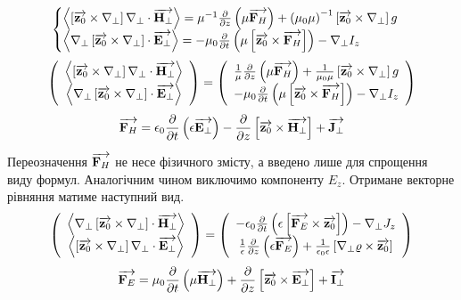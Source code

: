%
\textcolor{lightgray}{ \begin{equation*} \begin{aligned}
\begin{cases} 
\left< \left[ \overrightarrow{\mathbf z_0} \times \nabla_\perp \right] \nabla_\perp \cdot \overrightarrow{\mathbf H_\perp} \right> = 
\mu^{-1} \frac{\partial }{\partial z} \left( \mu \overrightarrow{\mathbf F_H} \right) +
\left( \mu_0 \mu \right)^{-1} \left[ \overrightarrow{\mathbf z_0} \times \nabla_\perp \right] g \\
\left< \nabla_\perp \left[ \overrightarrow{\mathbf z_0} \times \nabla_\perp \right] \cdot \overrightarrow{\mathbf E_\perp} \right>
= - \mu_0 \frac{\partial }{\partial t} \left( \mu \left[ \overrightarrow{\mathbf z_0} \times \overrightarrow{\mathbf F_H} \right] \right) -
\nabla_\perp I_z 
\end{cases}
\end{aligned} \end{equation*} }
%
\begin{equation}
\left( \begin{array}{c} 
\left< \left[ \overrightarrow{\mathbf z_0} \times \nabla_\perp \right] \nabla_\perp \cdot \overrightarrow{\mathbf H_\perp} \right> \\
\left< \nabla_\perp \left[ \overrightarrow{\mathbf z_0} \times \nabla_\perp \right] \cdot \overrightarrow{\mathbf E_\perp} \right> \\
\end{array} \right) = \left( \begin{array}{c} 
\frac{1}{\mu} \frac{\partial }{\partial z} \left( \mu \overrightarrow{\mathbf F_H} \right) +
\frac{1}{\mu_0 \mu} \left[ \overrightarrow{\mathbf z_0} \times \nabla_\perp \right] g \\
- \mu_0 \frac{\partial }{\partial t} \left( \mu \left[ \overrightarrow{\mathbf z_0} \times \overrightarrow{\mathbf F_H} \right] \right) -
\nabla_\perp I_z 
\end{array} \right)
\end{equation}
%
\begin{equation*}
\overrightarrow{\mathbf F_H} = \epsilon_0 \frac{\partial }{\partial t} \left( \epsilon \overrightarrow{\mathbf E_\perp} \right) - 
\frac{\partial }{\partial z} \left[ \overrightarrow{\mathbf z_0} \times \overrightarrow{\mathbf H_\perp} \right] + \overrightarrow{\mathbf J_\perp}
\end{equation*}

Переозначення $ \overrightarrow{\mathbf F_H} $ не несе фізичного змісту, а введено лише для 
спрощення виду формул. Аналогічним чином виключимо компоненту $ E_z $. Отримане 
векторне рівняння матиме наступний вид.
%
\begin{equation}
\left( \begin{array}{c} 
\left< \nabla_\perp \left[ \overrightarrow{\mathbf z_0} \times \nabla_\perp \right] \cdot \overrightarrow{\mathbf H_\perp} \right> \\
\left< \left[ \overrightarrow{\mathbf z_0} \times \nabla_\perp \right] \nabla_\perp \cdot \overrightarrow{\mathbf E_\perp} \right> \\
\end{array} \right) = \left( \begin{array}{c} 
- \epsilon_0 \frac{\partial }{\partial t} \left( \epsilon \left[ \overrightarrow{\mathbf F_E} \times \overrightarrow{\mathbf z_0} \right] 
\right) - \nabla_\perp J_z \\
\frac{1}{\epsilon} \frac{\partial }{\partial z} \left( \epsilon \overrightarrow{\mathbf F_E} \right) +
\frac{1}{\epsilon_0 \epsilon} \left[ \nabla_\perp \varrho \times \overrightarrow{\mathbf z_0} \right]
\end{array} \right)
\end{equation}
%
\begin{equation*}
\overrightarrow{\mathbf F_E} = \mu_0 \frac{\partial }{\partial t} \left( \mu  \overrightarrow{\mathbf H_\perp} \right) +
\frac{\partial }{\partial z} \left[ \overrightarrow{\mathbf z_0} \times \overrightarrow{\mathbf E_\perp} \right] + \overrightarrow{\mathbf I_\perp}
\end{equation*}

